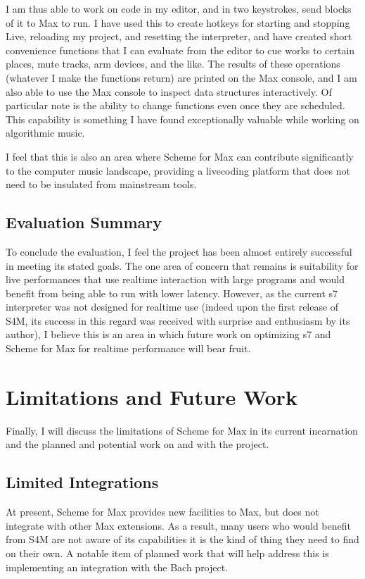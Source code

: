 \documentclass[letterpaper,10pt,english]{sphinxmanual}
\begin{document}
\sphinxAtStartPar
I am thus able to work on code in my editor, and in two keystrokes, send blocks of it to Max to run.
I have used this to create hotkeys for starting and stopping Live, reloading my project,
and resetting the interpreter, and have created short convenience functions that I can evaluate
from the editor to cue works to certain places, mute tracks, arm devices, and the like.
The results of these operations (whatever I make the functions return) are printed on the Max console,
and I am also able to use the Max console to inspect data structures interactively.
Of particular note is the ability to change functions even once they are scheduled.
This capability is something I have found exceptionally valuable while working on algorithmic music.

\sphinxAtStartPar
I feel that this is also an area where Scheme for Max can contribute significantly to the
computer music landscape, providing a live\sphinxhyphen{}coding platform that does not need to be insulated from
mainstream tools.


\subsection{Evaluation Summary}
\label{\detokenize{conclusion:evaluation-summary}}
\sphinxAtStartPar
To conclude the evaluation,  I feel the project has been almost entirely successful
in meeting its stated goals.
The one area of concern that remains is suitability for live performances that use realtime interaction with
large programs and would benefit from being able to run with lower latency.
However, as the current s7 interpreter was not designed for realtime use (indeed upon the first release
of S4M, its success in this regard was received with surprise and enthusiasm by its author),
I believe this is an area in which future work on optimizing
s7 and Scheme for Max for realtime performance will bear fruit.


\section{Limitations and Future Work}
\label{\detokenize{conclusion:limitations-and-future-work}}
\sphinxAtStartPar
Finally, I will discuss the limitations of Scheme for Max in its current incarnation and
the planned and potential work on and with the project.


\subsection{Limited Integrations}
\label{\detokenize{conclusion:limited-integrations}}
\sphinxAtStartPar
At present, Scheme for Max provides new facilities to Max, but does not integrate
with other Max extensions. As a result, many users who would benefit from S4M are
not aware of its capabilities \sphinxhyphen{} it is the kind of thing they need to find on their own.
A notable item of planned work that will help address this is implementing an integration with the Bach project.
\end{document}
